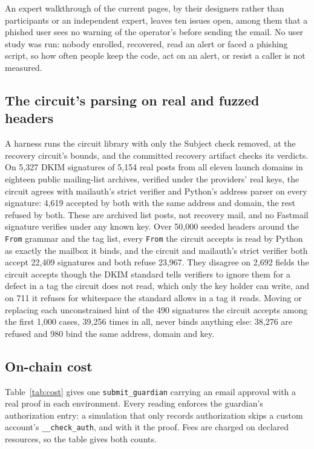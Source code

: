 An expert walkthrough of the current pages, by their designers rather than
participants or an independent expert, leaves ten issues open, among them
that a phished user sees no warning of the operator's before sending the
email. No user study was run: nobody enrolled,
recovered, read an alert or faced a phishing script, so how often people
keep the code, act on an alert, or resist a caller is not
measured.

\subsection{The circuit's parsing on real and fuzzed headers}\label{sec:eval-parser}
A harness runs the circuit library with only the Subject check removed, at
the recovery circuit's bounds, and the committed recovery artifact checks its
verdicts. On 5{,}327 DKIM signatures of 5{,}154 real posts from all eleven
launch domains in eighteen public mailing-list archives, verified under the
providers' real keys, the circuit agrees with mailauth's strict verifier and
Python's address parser on every signature: 4{,}619 accepted by both with the
same address and domain, the rest refused by both. These are archived list
posts, not recovery mail, and no Fastmail signature verifies under any known
key. Over 50{,}000 seeded headers around the
\texttt{From} grammar and the tag list, every \texttt{From} the circuit
accepts is read by Python as exactly the mailbox it binds, and the circuit
and mailauth's strict verifier both accept 22{,}409 signatures and both
refuse 23{,}967. They disagree on 2{,}692 fields the circuit accepts though
the DKIM standard tells verifiers to ignore them for a defect in a tag the
circuit does not read, which only the key holder can write, and on 711 it
refuses for whitespace the standard allows in a tag it
reads. Moving or replacing each unconstrained hint of
the 490 signatures the circuit accepts among the first 1{,}000 cases, 39{,}256
times in all, never binds anything else: 38{,}276 are refused and 980 bind the
same address, domain and key.

\subsection{On-chain cost}\label{sec:eval-cost}
Table~\ref{tab:cost} gives one \texttt{submit\_guardian} carrying an email
approval with a real proof in each environment. Every reading enforces the
guardian's authorization entry: a simulation that only records authorization
skips a custom account's \texttt{\_\_check\_auth}, and with it the proof.
Fees are charged on declared resources, so the table gives both counts.

